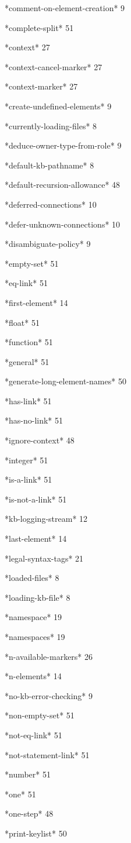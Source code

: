 \documentclass[titlepage,twoside,openright,11pt]{article}
\begin{document}
*comment-on-element-creation* 9

*complete-split* 51

*context* 27

*context-cancel-marker* 27

*context-marker* 27

*create-undefined-elements* 9

*currently-loading-files* 8

*deduce-owner-type-from-role* 9

*default-kb-pathname* 8

*default-recursion-allowance* 48

*deferred-connections* 10

*defer-unknown-connections* 10

*disambiguate-policy* 9

*empty-set* 51

*eq-link* 51

*first-element* 14

*float* 51

*function* 51

*general* 51

*generate-long-element-names* 50

*has-link* 51

*has-no-link* 51

*ignore-context* 48

*integer* 51

*is-a-link* 51

*is-not-a-link* 51

*kb-logging-stream* 12

*last-element* 14

*legal-syntax-tags* 21

*loaded-files* 8

*loading-kb-file* 8

*namespace* 19

*namespaces* 19

*n-available-markers* 26

*n-elements* 14

*no-kb-error-checking* 9

*non-empty-set* 51

*not-eq-link* 51

*not-statement-link* 51

*number* 51

*one* 51

*one-step* 48

*print-keylist* 50
\end{document}

